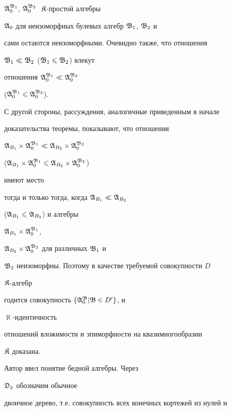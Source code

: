\begin{pf}
$\frak A^{\frak B_1}_0$, $\frak A^{\frak B_2}_0\;$ $\frak K$-простой алгебры


$\frak A_0$ для неизоморфных булевых алгебр $\frak B_1$, $\frak B_2$ и


сами остаются неизоморфными. Очевидно также, что отношения


$\frak B_1\ll\frak B_2$ ($\frak B_1\leqslant\frak B_2$) влекут


отношения $\frak A_0^{\frak B_1}\ll\frak A_0^{\frak B_2}$


($\frak A_0^{\frak B_1}\leqslant\frak A_0^{\frak B_2}$).





С другой стороны, рассуждения, аналогичные приведенным в начале


доказательства теоремы, показывают, что отношения


$\frak A_{B_1}\times\frak A_0^{\frak B_1}\ll\frak A_{B_2}\times


\frak A_0^{\frak B_2}$


($\frak A_{B_1}\times\frak A_0^{\frak B_1}\les\frak A_{B_2}\times


\frak A_0^{\frak B_2}$)


имеют место


тогда и только тогда, когда $\frak A_{B_1}\ll\frak A_{B_2}$


($\frak A_{B_1}\leqslant\frak A_{B_2}$) и алгебры


$\frak A_{B_1}\times\frak A_0^{\frak B_1}$,


$\frak A_{B_2}\times\frak A_0^{\frak B_2}$ для различных $\frak B_1$ и


$\frak B_2$ неизоморфны. Поэтому в качестве требуемой совокупности $D\;$


$\frak K$-алгебр


годится совокупность $\{\frak A_0^{\frak B}|\frak B\in D'\}$, и


$\aleph$-идентичность


отношений вложимости и эпиморфности на квазимногообразии


$\frak K$ доказана.


\end{pf}





Автор \cite{P7} ввел понятие бедной алгебры. Через


$\frak D_2$ обозначим обычное


двоичное дерево, т.е. совокупность всех конечных кортежей из нулей и


